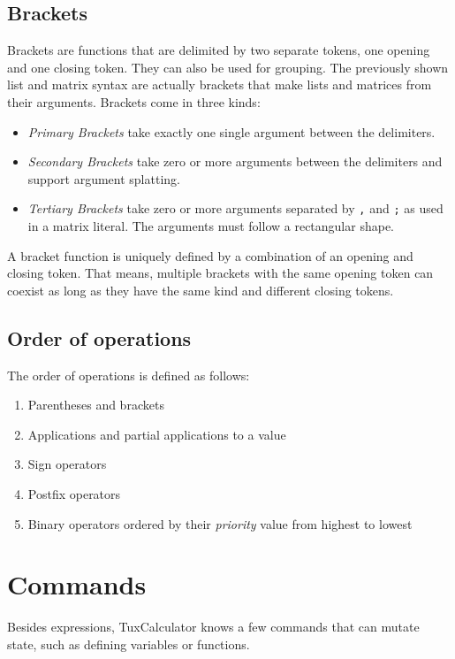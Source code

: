 \documentclass[10pt]{article}
\begin{document}
    \subsection{Brackets}\label{subsec:brackets}
    Brackets are functions that are delimited by two separate tokens, one opening and one closing token.
    They can also be used for grouping.
    The previously shown list and matrix syntax are actually brackets that make lists and matrices from their arguments.
    Brackets come in three kinds:
    \begin{itemize}
        \item \textsl{Primary Brackets} take exactly one single argument between the delimiters.
        \item \textsl{Secondary Brackets} take zero or more arguments between the delimiters and support argument splatting.
        \item \textsl{Tertiary Brackets} take zero or more arguments separated by \verb|,| and \verb|;| as used in a matrix literal.
              The arguments must follow a rectangular shape.
    \end{itemize}
    A bracket function is uniquely defined by a combination of an opening and closing token.
    That means, multiple brackets with the same opening token can coexist as long as they have the same kind and different closing tokens.
    
    \subsection{Order of operations}\label{subsec:order-of-operations}
    The order of operations is defined as follows:
    \begingroup
    \setlength{\parskip}{0pt}
    \begin{enumerate}
        \item Parentheses and brackets
        \item Applications and partial applications to a value
        \item Sign operators
        \item Postfix operators
        \item Binary operators ordered by their \textsl{priority} value from highest to lowest
    \end{enumerate}
    \endgroup
    
    \section{Commands}\label{sec:commands}
    Besides expressions, TuxCalculator knows a few commands that can mutate state, such as defining variables or functions.
    
\end{document}
